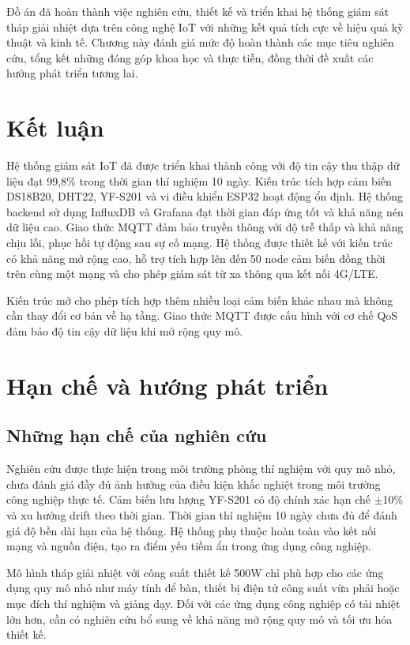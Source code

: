 \documentclass[../main.tex]{subfiles}
\begin{document}
Đồ án đã hoàn thành việc nghiên cứu, thiết kế và triển khai hệ thống giám sát tháp giải nhiệt dựa trên công nghệ IoT với những kết quả tích cực về hiệu quả kỹ thuật và kinh tế. Chương này đánh giá mức độ hoàn thành các mục tiêu nghiên cứu, tổng kết những đóng góp khoa học và thực tiễn, đồng thời đề xuất các hướng phát triển tương lai.

\section{Kết luận}
\label{sec:conclusion}

Hệ thống giám sát IoT đã được triển khai thành công với độ tin cậy thu thập dữ liệu đạt 99,8\% trong thời gian thí nghiệm 10 ngày. Kiến trúc tích hợp cảm biến DS18B20, DHT22, YF-S201 và vi điều khiển ESP32 hoạt động ổn định. Hệ thống backend sử dụng InfluxDB và Grafana đạt thời gian đáp ứng tốt và khả năng nén dữ liệu cao. Giao thức MQTT đảm bảo truyền thông với độ trễ thấp và khả năng chịu lỗi, phục hồi tự động sau sự cố mạng. Hệ thống được thiết kế với kiến trúc có khả năng mở rộng cao, hỗ trợ tích hợp lên đến 50 node cảm biến đồng thời trên cùng một mạng và cho phép giám sát từ xa thông qua kết nối 4G/LTE.

Kiến trúc mở cho phép tích hợp thêm nhiều loại cảm biến khác nhau mà không cần thay đổi cơ bản về hạ tầng. Giao thức MQTT được cấu hình với cơ chế QoS đảm bảo độ tin cậy dữ liệu khi mở rộng quy mô.

\section{Hạn chế và hướng phát triển}
\label{sec:limitations_future}

\subsection{Những hạn chế của nghiên cứu}
\label{sec:research_limitations}

Nghiên cứu được thực hiện trong môi trường phòng thí nghiệm với quy mô nhỏ, chưa đánh giá đầy đủ ảnh hưởng của điều kiện khắc nghiệt trong môi trường công nghiệp thực tế. Cảm biến lưu lượng YF-S201 có độ chính xác hạn chế $\pm$10\% và xu hướng drift theo thời gian. Thời gian thí nghiệm 10 ngày chưa đủ để đánh giá độ bền dài hạn của hệ thống. Hệ thống phụ thuộc hoàn toàn vào kết nối mạng và nguồn điện, tạo ra điểm yếu tiềm ẩn trong ứng dụng công nghiệp.

Mô hình tháp giải nhiệt với công suất thiết kế 500W chỉ phù hợp cho các ứng dụng quy mô nhỏ như máy tính để bàn, thiết bị điện tử công suất vừa phải hoặc mục đích thí nghiệm và giảng dạy. Đối với các ứng dụng công nghiệp có tải nhiệt lớn hơn, cần có nghiên cứu bổ sung về khả năng mở rộng quy mô và tối ưu hóa thiết kế.
\end{document}
